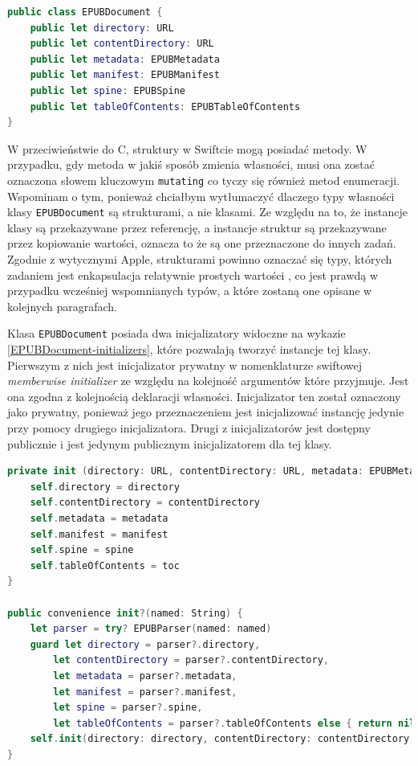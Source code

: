 \begin{lstlisting}[caption={Klasa EPUBDocument i jej stałe publiczne}, language=swift,label=EPUBDocument-declaration]
public class EPUBDocument {
    public let directory: URL
    public let contentDirectory: URL
    public let metadata: EPUBMetadata
    public let manifest: EPUBManifest
    public let spine: EPUBSpine
    public let tableOfContents: EPUBTableOfContents
}
\end{lstlisting}

W przeciwieństwie do C, struktury w Swiftcie mogą posiadać metody. W przypadku, gdy metoda w jakiś sposób zmienia własności, musi ona zostać oznaczona słowem kluczowym \texttt{mutating} co tyczy się również metod enumeracji. Wspominam o tym, ponieważ chciałbym wytłumaczyć dlaczego typy własności klasy \texttt{EPUBDocument} są strukturami, a nie klasami. Ze względu na to, że instancje klasy są przekazywane przez referencję, a instancje struktur są przekazywane przez kopiowanie wartości, oznacza to że są one przeznaczone do innych zadań. Zgodnie z wytycznymi Apple, strukturami powinno oznaczać się typy, których zadaniem jest enkapsulacja relatywnie prostych wartości \cite{theSwiftProgrammingLanguage}, co jest prawdą w przypadku wcześniej wspomnianych typów, a które zostaną one opisane w kolejnych paragrafach.

Klasa \texttt{EPUBDocument} posiada dwa inicjalizatory widoczne na wykazie \ref{EPUBDocument-initializers}, które pozwalają tworzyć instancje tej klasy. Pierwszym z nich jest inicjalizator prywatny w nomenklaturze swiftowej \textit{memberwise initializer} ze względu na kolejność argumentów które przyjmuje. Jest ona zgodna  z kolejnością deklaracji własności. Inicjalizator ten został oznaczony jako prywatny, ponieważ jego przeznaczeniem jest inicjalizować instancję jedynie przy pomocy drugiego inicjalizatora. Drugi z inicjalizatorów jest dostępny publicznie i jest jedynym publicznym inicjalizatorem dla tej klasy.

\begin{lstlisting}[caption={Inicjalizatory klasy EPUBDocument}, language=swift,label=EPUBDocument-initializers]
private init (directory: URL, contentDirectory: URL, metadata: EPUBMetadata, manifest: EPUBManifest, spine: EPUBSpine, toc: EPUBTableOfContents) {
    self.directory = directory
    self.contentDirectory = contentDirectory
    self.metadata = metadata
    self.manifest = manifest
    self.spine = spine
    self.tableOfContents = toc
}

public convenience init?(named: String) {
    let parser = try? EPUBParser(named: named)
    guard let directory = parser?.directory,
        let contentDirectory = parser?.contentDirectory,
        let metadata = parser?.metadata,
        let manifest = parser?.manifest,
        let spine = parser?.spine,
        let tableOfContents = parser?.tableOfContents else { return nil }
    self.init(directory: directory, contentDirectory: contentDirectory, metadata: metadata, manifest: manifest, spine: spine, toc: tableOfContents)
}
\end{lstlisting}

